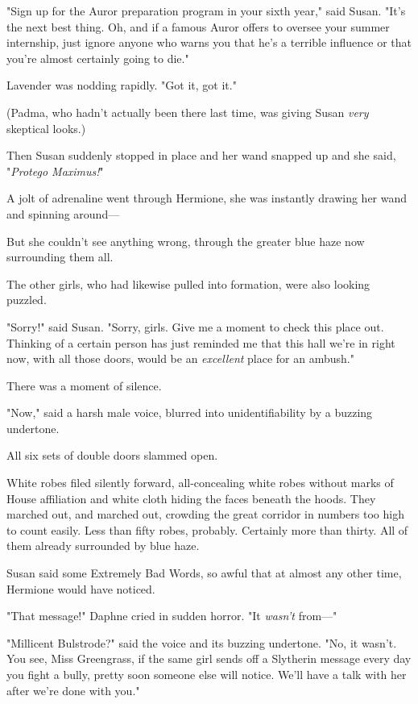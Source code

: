 "Sign up for the Auror preparation program in your sixth year," said Susan.
"It's the next best thing. Oh, and if a famous Auror offers to oversee your
summer internship, just ignore anyone who warns you that he's a terrible
influence or that you're almost certainly going to die."

Lavender was nodding rapidly. "Got it, got it."

(Padma, who hadn't actually been there last time, was giving Susan \emph{very}
skeptical looks.)

Then Susan suddenly stopped in place and her wand snapped up and she said,
"\emph{Protego Maximus!}"

A jolt of adrenaline went through Hermione, she was instantly drawing her wand
and spinning around—

But she couldn't see anything wrong, through the greater blue haze now
surrounding them all.

The other girls, who had likewise pulled into formation, were also looking
puzzled.

"Sorry!" said Susan. "Sorry, girls. Give me a moment to check this place out.
Thinking of a certain person has just reminded me that this hall we're in right
now, with all those doors, would be an \emph{excellent} place for an ambush."

There was a moment of silence.

"Now," said a harsh male voice, blurred into unidentifiability by a buzzing
undertone.

All six sets of double doors slammed open.

White robes filed silently forward, all-concealing white robes without marks of
House affiliation and white cloth hiding the faces beneath the hoods. They
marched out, and marched out, crowding the great corridor in numbers too high
to count easily. Less than fifty robes, probably. Certainly more than thirty.
All of them already surrounded by blue haze.

Susan said some Extremely Bad Words, so awful that at almost any other time,
Hermione would have noticed.

"That message!" Daphne cried in sudden horror. "It \emph{wasn't} from—"

"Millicent Bulstrode?" said the voice and its buzzing undertone. "No, it
wasn't. You see, Miss Greengrass, if the same girl sends off a Slytherin
message every day you fight a bully, pretty soon someone else will notice.
We'll have a talk with her after we're done with you."

